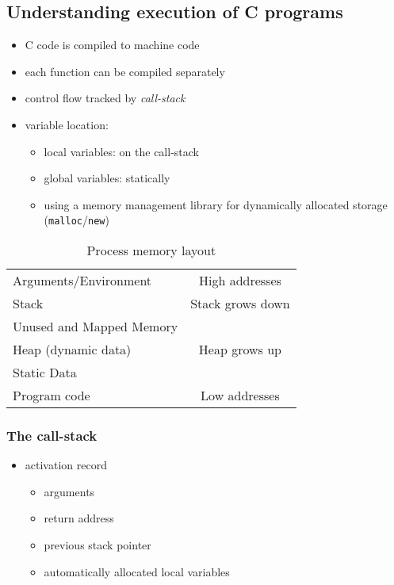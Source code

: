 \documentclass[12pt,titlepage,a4paper]{report}
\begin{document}
			\subsection{Understanding execution of C programs}
				\begin{itemize}
					\item C code is compiled to machine code
					\item each function can be compiled separately
					\item control flow tracked by \emph{call-stack}
					\item variable location:
					\begin{itemize}
						\item local variables: on the call-stack
						\item global variables: statically
						\item using a memory management library for dynamically allocated storage (\texttt{malloc}/\texttt{new})
					\end{itemize}
				\end{itemize}
				\begin{table}[h!]
					\centering
					\begin{tabular}{| l | c}
						\cline{1-1}
						Arguments/Environment & High addresses \\ \cline{1-1}
						Stack & Stack grows down \\ \cline{1-1}
						\cellcolor{gray}Unused and Mapped Memory & \\ \cline{1-1}
						Heap (dynamic data) & Heap grows up \\ \cline{1-1}
						Static Data & \\ \cline{1-1}
						Program code & Low addresses \\ \cline{1-1}
					\end{tabular}
					\caption{Process memory layout}
				\end{table}

			\subsubsection{The call-stack}
				\begin{itemize}
					\item activation record
					\begin{itemize}
						\item arguments
						\item return address
						\item previous stack pointer
						\item automatically allocated local variables
					\end{itemize}
				\end{itemize}
			
\end{document}
